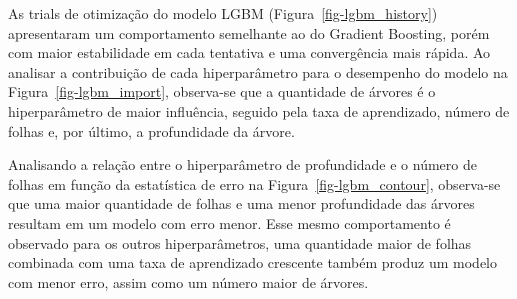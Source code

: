 \documentclass[
  12pt,
  a4paper,
]{scrreprt}
\begin{document}
\vspace{12pt}

As trials de otimização do modelo LGBM (Figura~\ref{fig-lgbm_history})
apresentaram um comportamento semelhante ao do Gradient Boosting, porém
com maior estabilidade em cada tentativa e uma convergência mais rápida.
Ao analisar a contribuição de cada hiperparâmetro para o desempenho do
modelo na Figura~\ref{fig-lgbm_import}, observa-se que a quantidade de
árvores é o hiperparâmetro de maior influência, seguido pela taxa de
aprendizado, número de folhas e, por último, a profundidade da árvore.

\vspace{12pt}

Analisando a relação entre o hiperparâmetro de profundidade e o número
de folhas em função da estatística de erro na
Figura~\ref{fig-lgbm_contour}, observa-se que uma maior quantidade de
folhas e uma menor profundidade das árvores resultam em um modelo com
erro menor. Esse mesmo comportamento é observado para os outros
hiperparâmetros, uma quantidade maior de folhas combinada com uma taxa
de aprendizado crescente também produz um modelo com menor erro, assim
como um número maior de árvores.
\end{document}
